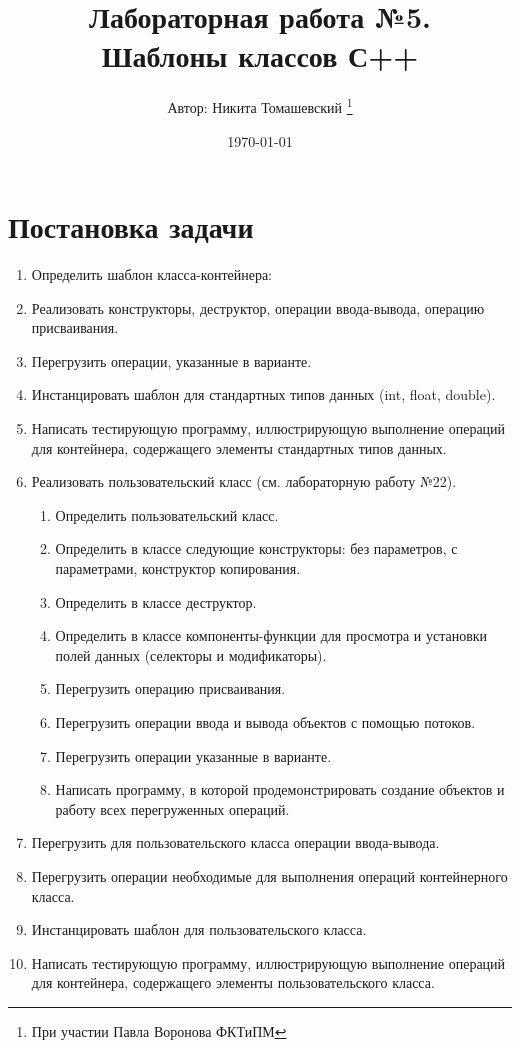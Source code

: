 

\title{Лабораторная работа №5. \\
    \large Шаблоны классов С++}

\author{Автор: Никита Томашевский \thanks{При участии Павла Воронова ФКТиПМ}}
\date{\today}


    \maketitle\newpage
    \tableofcontents\newpage
    \section{Постановка задачи}
    \begin{enumerate}
        \item Определить шаблон класса-контейнера:
        \item Реализовать конструкторы, деструктор, операции ввода-вывода, операцию присваивания.
        \item Перегрузить операции, указанные в варианте.
        \item Инстанцировать шаблон для стандартных типов данных (int, float, double).
        \item Написать тестирующую программу, иллюстрирующую выполнение операций для контейнера, содержащего элементы стандартных типов данных.
        \item Реализовать пользовательский класс (см. лабораторную работу №22).
        \begin{enumerate}
            \item Определить пользовательский класс.
            \item Определить в классе следующие конструкторы: без параметров, с параметрами, конструктор копирования.
            \item Определить в классе деструктор.
            \item Определить в классе компоненты-функции для просмотра и установки полей данных (селекторы и модификаторы).
            \item Перегрузить операцию присваивания.
            \item Перегрузить операции ввода и вывода объектов с помощью потоков.
            \item Перегрузить операции указанные в варианте.
            \item Написать программу, в которой продемонстрировать создание объектов и работу всех перегруженных операций.
        \end{enumerate}
        \item Перегрузить для пользовательского класса операции ввода-вывода.
        \item Перегрузить операции необходимые для выполнения операций контейнерного класса.
        \item Инстанцировать шаблон для пользовательского класса.
        \item Написать тестирующую программу, иллюстрирующую выполнение операций для контейнера, содержащего элементы пользовательского класса.
    \end{enumerate}
    \newpage
